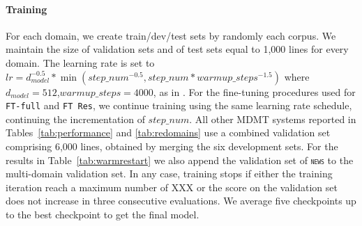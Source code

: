 \documentclass[11pt,a4paper]{article}
\newcommand{\fyTodo}[1]{\Todo[FY:]{\textcolor{orange}{#1}}}
\newcommand{\domain}[1]{\texttt{\textsc{#1}}}
\newcommand{\system}[1]{\texttt{{#1}}}
\begin{document}
{\paragraph{Training} For each domain, we create train/dev/test sets by randomly each corpus. We maintain the size of validation sets and of test sets equal to 1,000 lines for every domain.
The learning rate is set to $lr = d_{model}^{-0.5}*\min(step\_num^{-0.5},step\_num * warmup\_steps^{-1.5})$ where $d_{model}=512$,$warmup\_steps=4000$, as in \cite{Vaswani17attention}. For the fine-tuning procedures used for \system{FT-full} and \system{FT Res}, we continue training using the same learning rate schedule, continuing the incrementation of $step\_num$. All other MDMT systems reported in Tables~\ref{tab:performance} and \ref{tab:redomains} use a combined validation set comprising 6,000 lines, obtained by merging the six development sets. For the results in Table~\ref{tab:warmrestart} we also append the validation set of \domain{news} to the multi-domain validation set. In any case, training stops if either the training iteration reach a maximum number of XXX\fyTodo{How many ?} or the score on the validation set does not increase in three consecutive evaluations. We average five checkpoints up to the best checkpoint to get the final model.\fyTodo{up to the best ?}
}
\end{document}
